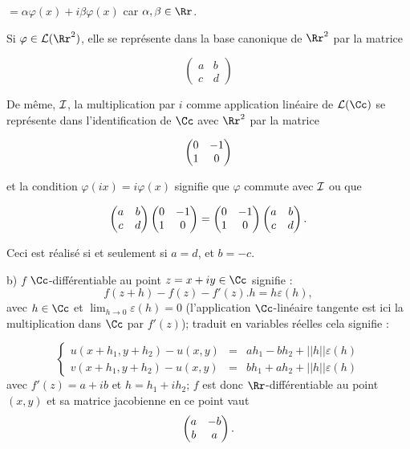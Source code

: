 {\begin{enumerate}
{\quad $=\alpha\varphi(x)+i\beta\varphi(x)$ car $\alpha,\beta\in\Rr$.

\medskip

Si $\varphi\in{\cal L}(\Rr^2)$, elle se représente dans la base canonique
de $\Rr^2$ par la matrice 

$$\begin{pmatrix}a&b\\ c&d \end{pmatrix}$$

De même, $\cal I$, la multiplication par $i$ comme application linéaire de 
${\cal L}(\Cc)$ se représente dans l'identification de $\Cc$ avec $\Rr^2$
par la matrice

$$\begin{pmatrix}0&-1\cr 1&0 \cr \end{pmatrix}$$

et la condition  $\varphi(ix)=i\varphi(x)$ signifie que $\varphi$ commute
avec $\cal I$ ou que 

$$\begin{pmatrix}a&b\cr c&d \cr\end{pmatrix}
\begin{pmatrix}0&-1\cr 1&0 \cr \end{pmatrix}=
\begin{pmatrix}0&-1\cr 1&0 \cr\end{pmatrix}
\begin{pmatrix}a&b\cr c&d \cr \end{pmatrix}.$$

Ceci est réalisé si et seulement si $a=d$, et $b=-c$.

\smallskip

b) $f$ $\Cc$-différentiable au point $z=x+iy\in \Cc$ signifie : 
$$f(z+h)-f(z)-f'(z).h=h\varepsilon(h),$$ avec $h\in\Cc$ et $\lim_{h\to
0}\varepsilon(h)=0$ (l'application 
$\Cc$-linéaire tangente est ici la multiplication dans $\Cc$ par $f'(z)$);
traduit en variables réelles cela signifie :

$$\left \{
\begin{array}{ccc} 
u(x+h_1,y+h_2)-u(x,y)&=&ah_1-bh_2+ ||h||
\varepsilon(h)\\
v(x+h_1,y+h_2)-u(x,y)&=&bh_1+ah_2+ ||h||
\varepsilon(h)
\end{array}\right.$$
avec $f'(z)=a+ib$ et $h=h_1+ih_2$; 
$f$ est donc $\Rr$-différentiable au point $(x,y)$  et sa
matrice jacobienne en ce point vaut 
$$\begin{pmatrix}a&-b\cr b&a \cr \end{pmatrix}.$$

}
\end{enumerate}}
